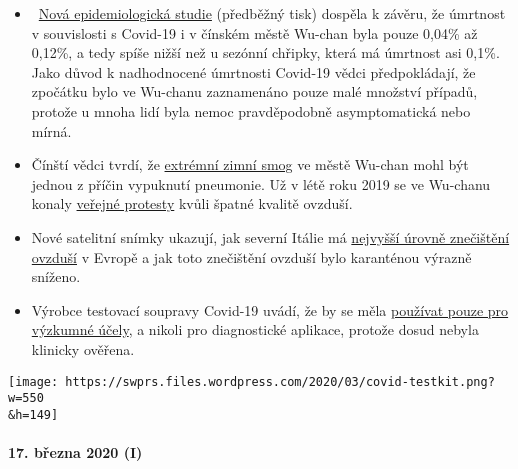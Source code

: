 \begin{itemize}
\tightlist
\item
  ~\href{https://www.medrxiv.org/content/10.1101/2020.02.12.20022434v2}{Nová
  epidemiologická studie} (předběžný tisk) dospěla k závěru, že úmrtnost
  v souvislosti s Covid-19 i v čínském městě Wu-chan byla pouze 0,04\%
  až 0,12\%, a tedy spíše nižší než u sezónní chřipky, která má úmrtnost
  asi 0,1\%. Jako důvod k nadhodnocené úmrtnosti Covid-19 vědci
  předpokládají, že zpočátku bylo ve Wu-chanu zaznamenáno pouze malé
  množství případů, protože u mnoha lidí byla nemoc pravděpodobně
  asymptomatická nebo mírná.
\item
  Čínští vědci tvrdí, že
  \href{https://www.eurasiareview.com/01022020-polluted-air-could-be-an-important-cause-of-wuhan-pneumonia-oped/}{extrémní
  zimní smog} ve městě Wu-chan mohl být jednou z příčin vypuknutí
  pneumonie. Už v létě roku 2019 se ve Wu-chanu konaly
  \href{https://www.cnn.com/2019/07/10/asia/china-wuhan-pollution-problems-intl-hnk/index.html}{veřejné
  protesty} kvůli špatné kvalitě ovzduší.
\item
  Nové satelitní snímky ukazují, jak severní Itálie má
  \href{https://twitter.com/esa/status/1238480433047916545}{nejvyšší
  úrovně znečištění ovzduší} v Evropě a jak toto znečištění ovzduší bylo
  karanténou výrazně sníženo.
\item
  Výrobce testovací soupravy Covid-19 uvádí, že by se měla
  \href{https://www.creative-diagnostics.com/sars-cov-2-coronavirus-multiplex-rt-qpcr-kit-277854-457.htm}{používat
  pouze pro výzkumné účely}, a nikoli pro diagnostické aplikace, protože
  dosud nebyla klinicky ověřena.
\end{itemize}

\texttt{[image: https://swprs.files.wordpress.com/2020/03/covid-testkit.png?w=550\\\&h=149]}

\hypertarget{17-bux159ezna-2020-i}{%
\paragraph{17. března 2020 (I)}\label{17-bux159ezna-2020-i}}

